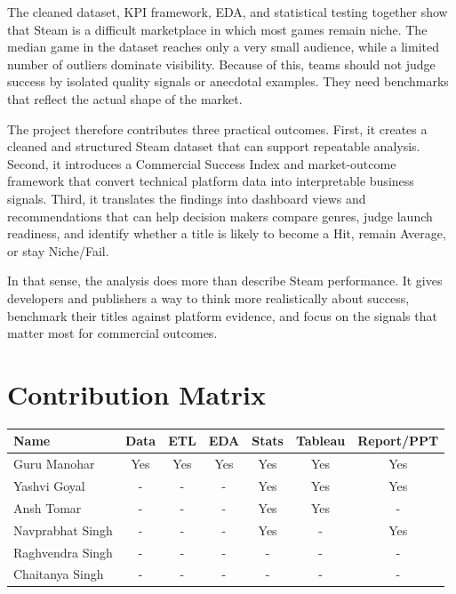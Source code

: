 \documentclass[12pt,a4paper]{report}
\begin{document}
The cleaned dataset, KPI framework, EDA, and statistical testing together show that Steam is a difficult marketplace in which most games remain niche. The median game in the dataset reaches only a very small audience, while a limited number of outliers dominate visibility. Because of this, teams should not judge success by isolated quality signals or anecdotal examples. They need benchmarks that reflect the actual shape of the market.

The project therefore contributes three practical outcomes. First, it creates a cleaned and structured Steam dataset that can support repeatable analysis. Second, it introduces a Commercial Success Index and market-outcome framework that convert technical platform data into interpretable business signals. Third, it translates the findings into dashboard views and recommendations that can help decision makers compare genres, judge launch readiness, and identify whether a title is likely to become a Hit, remain Average, or stay Niche/Fail.

In that sense, the analysis does more than describe Steam performance. It gives developers and publishers a way to think more realistically about success, benchmark their titles against platform evidence, and focus on the signals that matter most for commercial outcomes.

\chapter{Contribution Matrix}



\begin{longtable}{|p{3.8cm}|c|c|c|c|c|c|}
\hline
\textbf{Name} & \textbf{Data} & \textbf{ETL} & \textbf{EDA} & \textbf{Stats} & \textbf{Tableau} & \textbf{Report/PPT} \\
\hline
Guru Manohar & Yes & Yes & Yes & Yes & Yes & Yes \\
\hline
Yashvi Goyal & - & - & - & Yes & Yes & Yes \\
\hline
Ansh Tomar & - & - & - & Yes & Yes & - \\
\hline
Navprabhat Singh & - & - & - & Yes & - & Yes \\
\hline
Raghvendra Singh & - & - & - & - & - & - \\
\hline
Chaitanya Singh & - & - & - & - & - & - \\
\hline
\end{longtable}
\end{document}
